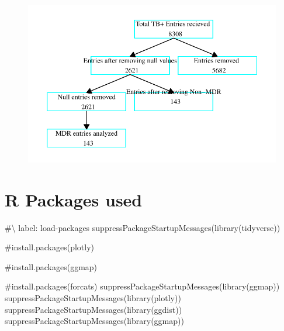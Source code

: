 \documentclass[
]{report}
\newenvironment{Shaded}{\begin{snugshade}}{\end{snugshade}}
\newcommand{\CommentTok}[1]{\textcolor[rgb]{0.37,0.37,0.37}{#1}}
\newcommand{\FunctionTok}[1]{\textcolor[rgb]{0.28,0.35,0.67}{#1}}
\newcommand{\NormalTok}[1]{\textcolor[rgb]{0.00,0.23,0.31}{#1}}
\newcommand{\StringTok}[1]{\textcolor[rgb]{0.13,0.47,0.30}{#1}}
\begin{document}
\begin{figure}[H]

{\centering \includegraphics{MDR_TB_files/figure-pdf/unnamed-chunk-1-1.pdf}

}

\end{figure}

\hypertarget{r-packages-used}{%
\section{R Packages used}\label{r-packages-used}}

\begin{Shaded}
\begin{Highlighting}[]
\CommentTok{\#\textbackslash{} label: load{-}packages}
\FunctionTok{suppressPackageStartupMessages}\NormalTok{(}\FunctionTok{library}\NormalTok{(}\StringTok{\textquotesingle{}tidyverse\textquotesingle{}}\NormalTok{))}

\CommentTok{\#install.packages(\textquotesingle{}plotly\textquotesingle{})}

\CommentTok{\#install.packages(\textquotesingle{}ggmap\textquotesingle{})}

\CommentTok{\#install.packages(\textquotesingle{}forcats\textquotesingle{})}
\FunctionTok{suppressPackageStartupMessages}\NormalTok{(}\FunctionTok{library}\NormalTok{(}\StringTok{\textquotesingle{}ggmap\textquotesingle{}}\NormalTok{))}
\FunctionTok{suppressPackageStartupMessages}\NormalTok{(}\FunctionTok{library}\NormalTok{(}\StringTok{\textquotesingle{}plotly\textquotesingle{}}\NormalTok{))}
\FunctionTok{suppressPackageStartupMessages}\NormalTok{(}\FunctionTok{library}\NormalTok{(}\StringTok{\textquotesingle{}ggdist\textquotesingle{}}\NormalTok{))}
\FunctionTok{suppressPackageStartupMessages}\NormalTok{(}\FunctionTok{library}\NormalTok{(}\StringTok{\textquotesingle{}ggmap\textquotesingle{}}\NormalTok{))}
\end{Highlighting}
\end{Shaded}
\end{document}
